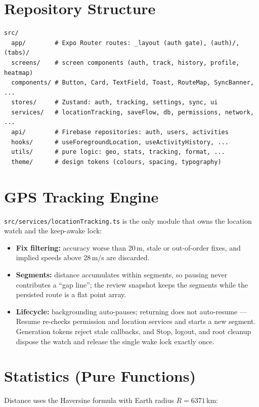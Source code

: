 \documentclass[12pt, a4paper]{report}
\newcommand{\code}[1]{\texttt{#1}}
\begin{document}
\section{Repository Structure}
\begin{lstlisting}[caption={Source layout (routes vs.\ reusable code)}]
src/
  app/        # Expo Router routes: _layout (auth gate), (auth)/, (tabs)/
  screens/    # screen components (auth, track, history, profile, heatmap)
  components/ # Button, Card, TextField, Toast, RouteMap, SyncBanner, ...
  stores/     # Zustand: auth, tracking, settings, sync, ui
  services/   # locationTracking, saveFlow, db, permissions, network, ...
  api/        # Firebase repositories: auth, users, activities
  hooks/      # useForegroundLocation, useActivityHistory, ...
  utils/      # pure logic: geo, stats, tracking, format, ...
  theme/      # design tokens (colours, spacing, typography)
\end{lstlisting}

\section{GPS Tracking Engine}
\code{src/services/locationTracking.ts} is the only module that owns the
location watch and the keep-awake lock:

\begin{itemize}[leftmargin=1.2cm]
  \item \textbf{Fix filtering:} accuracy worse than 20\,m, stale or
        out-of-order fixes, and implied speeds above 28\,m/s are discarded.
  \item \textbf{Segments:} distance accumulates within segments, so pausing
        never contributes a ``gap line''; the review snapshot keeps the
        segments while the persisted route is a flat point array.
  \item \textbf{Lifecycle:} backgrounding auto-pauses; returning does not
        auto-resume --- Resume re-checks permission and location services and
        starts a new segment. Generation tokens reject stale callbacks, and
        Stop, logout, and root cleanup dispose the watch and release the
        single wake lock exactly once.
\end{itemize}

\section{Statistics (Pure Functions)}
Distance uses the Haversine formula with Earth radius $R=6371$\,km:
\end{document}
